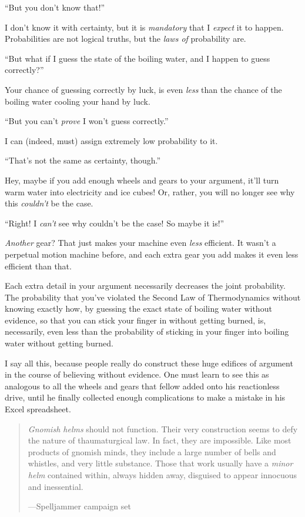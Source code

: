 {
 ``But you don't know
that!''}

{
 I don't know it with certainty, but it is
\textit{mandatory} that I \textit{expect} it to happen. Probabilities
are not logical truths, but the \textit{laws of} probability are.}

{
 ``But what if I guess the state of the boiling
water, and I happen to guess correctly?''}

{
 Your chance of guessing correctly by luck, is even \textit{less}
than the chance of the boiling water cooling your hand by luck.}

{
 ``But you can't \textit{prove} I
won't guess correctly.''}

{
 I can (indeed, must) assign extremely low probability to it.}

{
 ``That's not the same as
certainty, though.''}

{
 Hey, maybe if you add enough wheels and gears to your argument,
it'll turn warm water into electricity and ice cubes!
Or, rather, you will no longer see why this
\textit{couldn't} be the case.}

{
 ``Right! I \textit{can't} see why
couldn't be the case! So maybe it
is!''}

{
 \textit{Another} gear? That just makes your machine even
\textit{less} efficient. It wasn't a perpetual motion
machine before, and each extra gear you add makes it even less
efficient than that.}

{
 Each extra detail in your argument necessarily decreases the joint
probability. The probability that you've violated the
Second Law of Thermodynamics without knowing exactly how, by guessing
the exact state of boiling water without evidence, so that you can
stick your finger in without getting burned, is, necessarily, even less
than the probability of sticking in your finger into boiling water
without getting burned.}

{
 I say all this, because people really do construct these huge
edifices of argument in the course of believing without evidence. One
must learn to see this as analogous to all the wheels and gears that
fellow added onto his reactionless drive, until he finally collected
enough complications to make a mistake in his Excel spreadsheet.}

\myendsectiontext


\begin{quote}
{
 \textit{Gnomish helms} should not function. Their very
construction seems to defy the nature of thaumaturgical law. In fact,
they are impossible. Like most products of gnomish minds, they include
a large number of bells and whistles, and very little substance. Those
that work usually have a \textit{minor helm} contained within, always
hidden away, disguised to appear innocuous and inessential.}

{\raggedleft
 {}---Spelljammer campaign set
\par}
\end{quote}


